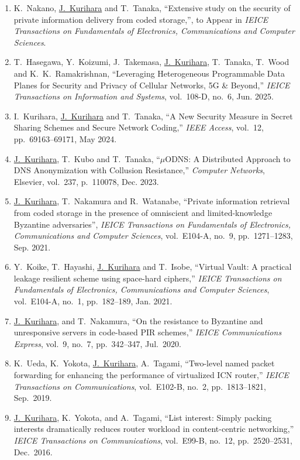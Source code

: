 \begin{enumerate}
\item K.~Nakano, \underline{J.~Kurihara} and T.~Tanaka, ``Extensive study on the security of private information delivery from coded storage,'', to Appear in \textit{IEICE Transactions on Fundamentals of Electronics, Communications and Computer Sciences}.
\item T.~Hasegawa, Y.~Koizumi, J.~Takemasa, \underline{J.~Kurihara}, T.~Tanaka, T.~Wood and K.~K.~Ramakrishnan, ``Leveraging Heterogeneous Programmable Data Planes for Security and Privacy of Cellular Networks, 5G \& Beyond,'' \textit{IEICE Transactions on Information and Systems}, vol.~108-D, no.~6, Jun. 2025.
 \item I.~Kurihara, \underline{J.~Kurihara} and T.~Tanaka, ``A New Security Measure in Secret Sharing Schemes and Secure Network Coding,'' \textit{IEEE Access}, vol.~12, pp.~69163--69171, May 2024.
 \item \underline{J.~Kurihara}, T.~Kubo and T.~Tanaka, ``$\mu$ODNS: A Distributed Approach to DNS Anonymization with Collusion Resistance,'' \textit{Computer Networks}, Elsevier, vol.~237, p.~110078, Dec. 2023.
 \item \underline{J.~Kurihara}, T.~Nakamura and R.~Watanabe, ``Private information retrieval from coded storage in the presence of omniscient and limited-knowledge Byzantine adversaries'', \textit{IEICE Transactions on Fundamentals of Electronics, Communications and Computer Sciences}, vol.~E104-A, no.~9, pp.~1271--1283, Sep. 2021.
 \item Y.~Koike, T.~Hayashi, \underline{J.~Kurihara} and T.~Isobe, ``Virtual Vault: A practical leakage resilient scheme using space-hard ciphers,'' \textit{IEICE Transactions on Fundamentals of Electronics, Communications and Computer Sciences}, vol.~E104-A, no.~1, pp.~182--189, Jan. 2021.
 \item \underline{J.~Kurihara}, and T.~Nakamura, ``On the resistance to Byzantine and unresponsive servers in code-based PIR schemes,'' \textit{IEICE Communications Express}, vol.~9, no.~7, pp.~342--347, Jul.~2020.
 \item K.~Ueda, K.~Yokota, \underline{J.~Kurihara}, A.~Tagami, ``Two-level named packet forwarding for enhancing the performance of virtualized ICN router,'' \textit{IEICE Transactions on Communications}, vol.~E102-B, no.~2, pp.~1813--1821, Sep.~2019.
 \item \underline{J.~Kurihara}, K.~Yokota, and A.~Tagami, ``List interest: Simply packing interests dramatically reduces router workload in content-centric networking,'' \textit{IEICE Transactions on Communications}, vol.~E99-B, no.~12, pp.~2520--2531, Dec.~2016.

\end{enumerate}
